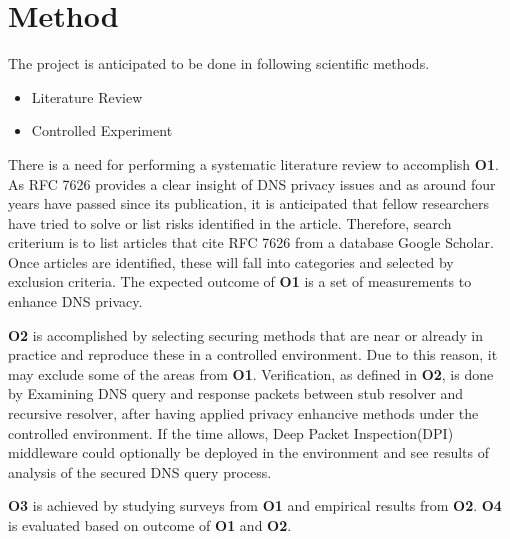 \documentclass[a4paper,12pt]{article}
\begin{document}
\section*{Method}
The project is anticipated to be done in following scientific methods.
\begin{itemize}
\item Literature Review
\item Controlled Experiment
\end{itemize}
There is a need for performing a systematic literature review to accomplish \textbf{O1}. As RFC 7626\cite{rfc7626} provides a clear insight of DNS privacy issues and as around four years have passed since its publication, it is anticipated that fellow researchers have tried to solve or list risks identified in the article. Therefore, search criterium is to list articles that cite RFC 7626 from a database Google Scholar. Once articles are identified, these will fall into categories and selected by exclusion criteria.
The expected outcome of \textbf{O1} is a set of measurements to enhance DNS privacy.

\textbf{O2} is accomplished by selecting securing methods that are near or already in practice and reproduce these in a controlled environment. Due to this reason, it may exclude some of the areas from \textbf{O1}. Verification, as defined in \textbf{O2}, is done by Examining DNS query and response packets between stub resolver and recursive resolver, after having applied privacy enhancive methods under the controlled environment. If the time allows, Deep Packet Inspection(DPI) middleware could optionally be deployed in the environment and see results of analysis of the secured DNS query process.

\textbf{O3} is achieved by studying surveys from \textbf{O1} and empirical results from \textbf{O2}. \textbf{O4} is evaluated based on outcome of \textbf{O1} and \textbf{O2}.
\end{document}
